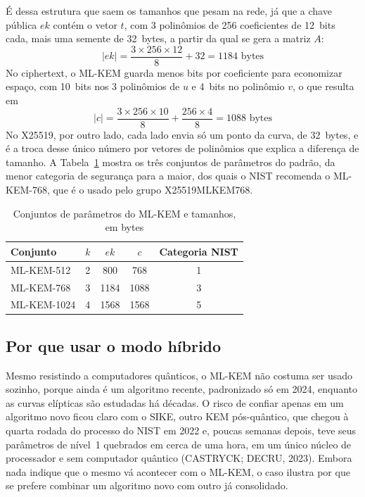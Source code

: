 \documentclass[12pt,a4paper]{article}
\newcommand{\fonte}[1]{\par\vspace{4pt}{\small Fonte: #1}}
\begin{document}
É dessa estrutura que saem os tamanhos que pesam na rede, já que a chave
pública $ek$ contém o vetor $t$, com 3 polinômios de 256 coeficientes de 12~bits cada,
mais uma semente de 32~bytes, a partir da qual se gera a matriz $A$:
\begin{equation}
|ek| = \frac{3 \times 256 \times 12}{8} + 32 = 1184 \text{ bytes}
\end{equation}
No ciphertext, o ML-KEM guarda menos bits por coeficiente para economizar
espaço, com 10~bits nos 3 polinômios de $u$ e 4~bits no polinômio $v$, o
que resulta em
\begin{equation}
|c| = \frac{3 \times 256 \times 10}{8} + \frac{256 \times 4}{8} = 1088 \text{ bytes}
\end{equation}
No X25519, por outro lado, cada lado envia só um ponto da curva, de
32~bytes, e é a troca desse único número por vetores de polinômios que
explica a diferença de tamanho. A Tabela~\ref{tab:params} mostra os três conjuntos de parâmetros do padrão,
da menor categoria de segurança para a maior, dos quais o NIST recomenda o
ML-KEM-768, que é o usado pelo grupo X25519MLKEM768.

\begin{table}[H]
\centering
\caption{Conjuntos de parâmetros do ML-KEM e tamanhos, em bytes}
\label{tab:params}
\begin{tabular}{lcccc}
\toprule
Conjunto & $k$ & $ek$ & $c$ & Categoria NIST \\
\midrule
ML-KEM-512  & 2 & 800  & 768  & 1 \\
ML-KEM-768  & 3 & 1184 & 1088 & 3 \\
ML-KEM-1024 & 4 & 1568 & 1568 & 5 \\
\bottomrule
\end{tabular}
\fonte{NIST (2024).}
\end{table}


\subsection{Por que usar o modo híbrido}
\label{sec:hibrido}

Mesmo resistindo a computadores quânticos, o ML-KEM não costuma ser usado
sozinho, porque ainda é um algoritmo recente, padronizado só em 2024,
enquanto as curvas elípticas são estudadas há décadas. O risco de confiar
apenas em um algoritmo novo ficou claro com o SIKE, outro KEM pós-quântico,
que chegou à quarta
rodada do processo do NIST em 2022 e, poucas semanas depois, teve seus
parâmetros de nível~1 quebrados em cerca de uma hora, em um único núcleo
de processador e sem computador quântico (CASTRYCK; DECRU, 2023). Embora
nada indique que o mesmo vá acontecer com o ML-KEM, o caso ilustra por que
se prefere combinar um algoritmo novo com outro já consolidado.
\end{document}
